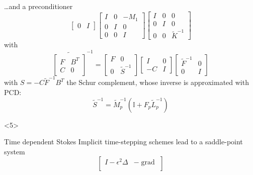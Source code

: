 \documentclass[presentation,aspectratio=43, 10pt]{beamer}
\DeclareMathOperator{\grad}{grad}
\begin{document}
\begin{frame}[t]
\begin{onlyenv}
\begin{block}{\dots and a preconditioner}
{\begin{equation*}
\begin{bmatrix}
            0 & I
          \end{bmatrix}
          \begin{bmatrix}
            I & 0 & -M_1\\
            0 & I & 0 \\
            0 & 0 & I
          \end{bmatrix}
          \begin{bmatrix}
            I & 0 & 0\\
            0 & I & 0\\
            0 & 0 & \tilde{K}^{-1}
          \end{bmatrix}
        \end{equation*}
        with
        \begin{equation*}
          \widetilde{\begin{bmatrix}
              F & B^T\\
              C & 0
            \end{bmatrix}}^{-1} = \begin{bmatrix}
            F & 0 \\
            0 & \tilde{S}^{-1}
          \end{bmatrix}
          \begin{bmatrix}
            I & 0\\
            -C & I
          \end{bmatrix}
          \begin{bmatrix}
            \tilde{F}^{-1} & 0 \\
            0 & I
          \end{bmatrix}
        \end{equation*}
        with $S = -C \tilde{F}^{-1} B^T$ the Schur complement, whose
        inverse is approximated with PCD:
        \begin{equation*}
          \tilde{S}^{-1} = \tilde{M}_p^{-1}(\mathbb{I} + F_p \tilde{L}_p^{-1})
        \end{equation*}
      }
    \end{block}
  \end{onlyenv}
  \begin{onlyenv}<5>
    \begin{block}{Time dependent Stokes}
      Implicit time-stepping schemes lead to a saddle-point system
      \begin{equation*}
        \begin{bmatrix}
          I - \epsilon^2 \Delta & -\grad\\

\end{bmatrix}
\end{equation*}
\end{block}
\end{onlyenv}
\end{frame}
\end{document}
